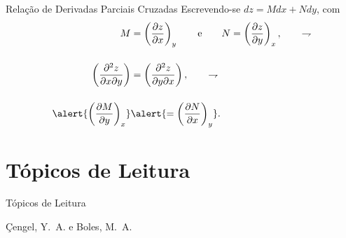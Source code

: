     \begin{frame}{Relação de Derivadas Parciais Cruzadas}\vspace*{-2em}
        Escrevendo-se \alert{$dz = Mdx + Ndy$}, com
        \begin{align*}
            M &=
                \left(
                    \frac{\partial z}{\partial x}
                \right)_y
            \qquad\mbox{e}\qquad
            N =
                \left(
                    \frac{\partial z}{\partial y}
                \right)_x,
            \qquad\rightharpoondown
            \\[\bigskipamount]
            \left(
                \frac{\partial^2 z}{\partial x\partial y}
            \right) &=
            \left(
                \frac{\partial^2 z}{\partial y\partial x}
            \right),
            \qquad\rightharpoondown
            \\[\bigskipamount]
            \alert{\left(
                \frac{\partial M}{\partial y}
            \right)_x} &\alert{=
            \left(
                \frac{\partial N}{\partial x}
            \right)_y}.
        \end{align*}
    \end{frame}

\section{Tópicos de Leitura}

    \begin{frame}[allowframebreaks]{Tópicos de Leitura}
        \begin{thebibliography}{Çengel, Y.~A., 2013}
                Çengel, Y.~A. e Boles, M.~A.
        \end{thebibliography}
    \end{frame}




